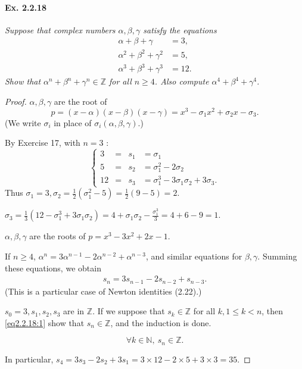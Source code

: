 \documentclass[11pt,a4paper]{article}
\newcommand{\Z}{\mathbb{Z}}
\begin{document}
\paragraph{Ex. 2.2.18}

{\it Suppose that complex numbers $\alpha,\beta,\gamma$ satisfy the equations
\begin{align*}
\alpha+\beta+\gamma &= 3,\\
\alpha^2+\beta^2+\gamma^2 &= 5,\\
\alpha^3+\beta^3+\gamma^3 &=12.
\end{align*}
Show that $\alpha^n+\beta^n+\gamma^n \in \Z$ for all $n\geq 4$. Also compute $\alpha^4+\beta^4+\gamma^4$.
}

\begin{proof}
$\alpha,\beta,\gamma$ are the root of $$p = (x-\alpha)(x-\beta)(x-\gamma) = x^3-\sigma_1x^2+\sigma_2x-\sigma_3.$$
(We write $\sigma_i$ in place of $\sigma_i(\alpha,\beta,\gamma)$.)

By Exercise 17, with $n=3$ :
$$
\left\{
\begin{array}{cccl}
 3 &  = & s_1 &=\sigma_1  \\
  5&  = &  s_2 &= \sigma_1^2 - 2 \sigma_2 \\
  12&=   &   s_3& = \sigma_1^3-3\sigma_1 \sigma_2 + 3 \sigma_3.
\end{array}
\right.
$$
Thus $\sigma_1 = 3, \sigma_2 = \frac{1}{2}(\sigma_1^2-5) = \frac{1}{2}(9-5) = 2$.

$\sigma_3 = \frac{1}{3}(12 - \sigma_1^3+3\sigma_1\sigma_2) = 4 +\sigma_1\sigma_2 -\frac{\sigma_1^3}{3} = 4 + 6 - 9 = 1$.

$\alpha,\beta,\gamma$ are the roots of $p = x^3-3x^2+2x-1$.

If $n \geq 4$, $\alpha^n = 3 \alpha^{n-1} - 2 \alpha^{n-2}+\alpha^{n-3}$, and similar equations for $\beta,\gamma$. Summing these equations, we obtain
\begin{align}
s_n = 3 s_{n-1} -2 s_{n-2}+s_{n-3}. \label{eq2.2.18:1}
\end{align}
(This is a particular case of Newton identities (2.22).)

$s_0 = 3, s_1,s_2,s_3$ are in $\mathbb{Z}$.  If we suppose that $s_k \in \mathbb{Z}$ for all $k, 1\leq k<n$, then \eqref{eq2.2.18:1} show that $s_n \in \mathbb{Z}$, and the induction is done.

$$\forall k \in \mathbb{N}, \ s_n \in \mathbb{Z}.$$

In particular, $s_4 = 3 s_3 - 2 s_2+3 s_1= 3\times 12- 2 \times 5 + 3 \times 3 = 35$.
\end{proof}
\end{document}
